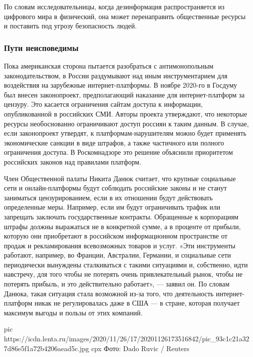 По словам исследовательницы, когда дезинформация распространяется из цифрового
мира в физический, она может перенаправить общественные ресурсы и поставить под
угрозу безопасность людей.

\subsubsection{Пути неисповедимы}

Пока американская сторона пытается разобраться с антимонопольным
законодательством, в России раздумывают над иным инструментарием для
воздействия на зарубежные интернет-платформы. В ноябре 2020-го в Госдуму был
внесен законопроект, предполагающий наказание для интернет-платформ за цензуру.
Это касается ограничения сайтам доступа к информации, опубликованной в
российских СМИ. Авторы проекта утверждают, что некоторые ресурсы необоснованно
ограничивают доступ россиян к таким данным. В случае, если законопроект
утвердят, к платформам-нарушителям можно будет применять экономические санкции
в виде штрафов, а также частичного или полного ограничения доступа. В
Роскомнадзоре это решение объяснили приоритетом российских законов над
правилами платформ.

Член Общественной палаты Никита Данюк считает, что крупные социальные сети и
онлайн-платформы будут соблюдать российские законы и не станут заниматься
цензурированием, если в их отношении будут действовать определенные меры.
Например, если им будут ограничивать трафик или запрещать заключать
государственные контракты. Обращенные к корпорациям штрафы должны выражаться не
в конкретной сумме, а в проценте от прибыли, которую они приобретают в
российском информационном пространстве от продаж и рекламирования всевозможных
товаров и услуг. «Эти инструменты работают, например, во Франции, Австралии,
Германии, и социальные сети периодически вынуждены сталкиваться с такими
ситуациями и, собственно, идти навстречу, для того чтобы не потерять очень
привлекательный рынок, чтобы не потерять прибыль, и это действительно
работает», — заявил он. По словам Данюка, такая ситуация стала возможной из-за
того, что деятельность интернет-платформ никак не регулировалась даже в США — в
стране, которая получает максимум выгоды и пользы от этих компаний.

\ifcmt
pic https://icdn.lenta.ru/images/2020/11/26/17/20201126173516842/pic_93c1c21a327d86e5f1a72b4206aead5c.jpg
cpx Фото: Dado Ruvic / Reuters
\fi

